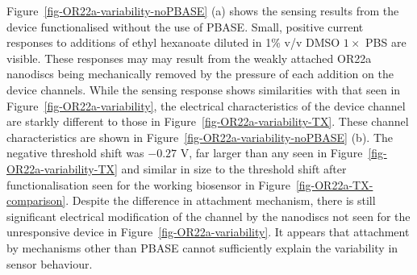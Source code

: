 \documentclass[
  a4paper,
]{scrbook}
\begin{document}
Figure~\ref{fig-OR22a-variability-noPBASE} (a) shows the sensing results
from the device functionalised without the use of PBASE. Small, positive
current responses to additions of ethyl hexanoate diluted in 1\% v/v
DMSO \(1 \times\) PBS are visible. These responses may may result from
the weakly attached OR22a nanodiscs being mechanically removed by the
pressure of each addition on the device channels. While the sensing
response shows similarities with that seen in
Figure~\ref{fig-OR22a-variability}, the electrical characteristics of
the device channel are starkly different to those in
Figure~\ref{fig-OR22a-variability-TX}. These channel characteristics are
shown in Figure~\ref{fig-OR22a-variability-noPBASE} (b). The negative
threshold shift was \(-0.27\) V, far larger than any seen in
Figure~\ref{fig-OR22a-variability-TX} and similar in size to the
threshold shift after functionalisation seen for the working biosensor
in Figure~\ref{fig-OR22a-TX-comparison}. Despite the difference in
attachment mechanism, there is still significant electrical modification
of the channel by the nanodiscs not seen for the unresponsive device in
Figure~\ref{fig-OR22a-variability}. It appears that attachment by
mechanisms other than PBASE cannot sufficiently explain the variability
in sensor behaviour.
\end{document}
